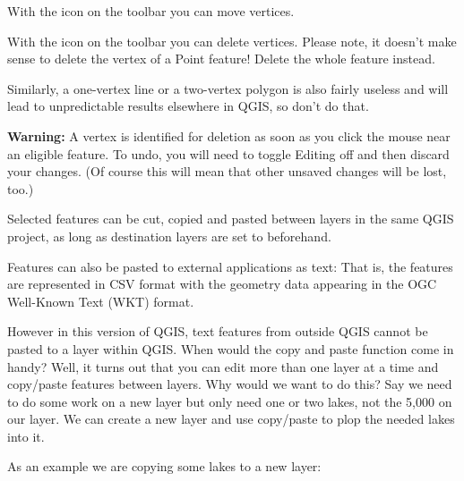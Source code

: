With the  icon on the toolbar you
can move vertices.

With the  icon on the toolbar
you can delete vertices. Please note, it
doesn't make sense to delete the vertex of a Point feature! Delete the whole
feature instead.

Similarly, a one-vertex line or a two-vertex polygon is also fairly useless
and will lead to unpredictable results elsewhere in QGIS, so don't do that.

\textbf{Warning:} A vertex is identified for deletion as soon as you click
the mouse near an eligible feature.  To undo, you will need to toggle Editing
off and then discard your changes. (Of course this will mean that other
unsaved changes will be lost, too.)


Selected features can be cut, copied and pasted between layers in the
same QGIS project, as long as destination layers are set to 
 beforehand.

Features can also be pasted to external applications as text:  That is,
the features are represented in CSV format with the geometry data appearing 
in the OGC Well-Known Text (WKT) format.

However in this version of QGIS, text features from outside QGIS cannot 
be pasted to a layer within QGIS. When would the copy and paste function 
come in handy? Well, it turns out that you can edit more than one layer 
at a time and copy/paste features between layers. Why would we want to do 
this?  Say we need to do some work on a new layer but only need one or 
two lakes, not the 5,000 on our  layer. We can create 
a new layer and use copy/paste to plop the needed lakes into it. 

As an example we are copying some lakes to a new layer:


